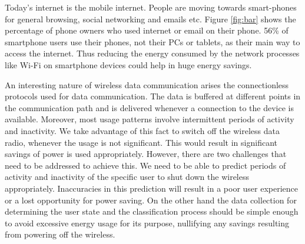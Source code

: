 
Today's internet is the mobile internet. People are moving towards smart-phones for general browsing, social networking and emails etc. Figure \ref{fig:bar} shows the percentage of phone owners who used internet or email on their phone. 56\% of smartphone users use their phones, not their PCs or tablets, as their main way to access the internet. Thus reducing the energy consumed by the network processes like Wi-Fi on smartphone devices could help in huge energy savings. 

\begin{center}
\begin{figure}[ht]
\end{figure}
\end{center}

An interesting nature of wireless data communication arises the connectionless protocols used for
data communication. The data is buffered at different points in the communication path and is delivered
whenever a connection to the device is available. Moreover, most usage patterns involve intermittent
periods of activity and inactivity. We take advantage of this fact to switch off the wireless data radio,
whenever the usage is not significant. This would result in significant savings of power is used appropriately.
However, there are two challenges that need to be addressed to achieve this. We need to be able to
predict periods of activity and inactivity of the specific user to shut down the wireless appropriately.
Inaccuracies in this prediction will result in a poor user experience or a lost opportunity for power saving.
On the other hand the data collection for determining the user state and the classification process should
be simple enough to avoid excessive energy usage for its purpose, nullifying any savings resulting
from powering off the wireless. 

